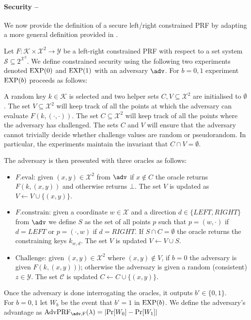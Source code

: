 \paragraph{Security -- } We now provide the definition of a secure left/right constrained PRF by adapting a more general definition provided in \cite{LRPRF}.

		\begin{secgame}
		Let $F: \mathcal{K} \times \mathcal{X}^2 \rightarrow \mathcal{Y}$ be a left-right constrained PRF with respect to a set system $\mathcal{S} \subseteq 2^{\mathcal{X}^2}$. We define constrained security using the following two experiments denoted $\mathrm{EXP}({0})$ and $\mathrm{EXP}({1})$ with an adversary $\adv$. For $b=0,1$ experiment $\mathrm{EXP}({b})$ proceeds as follows:

			A random key $k \in \mathcal{K}$ is selected and two helper sets $C,V \subseteq \mathcal{X}^2$ are initialised to $\emptyset$. The set $V \subseteq \mathcal{X}^2$ will keep track of all the points at which the adversary can evaluate $F(k, (\cdot,\cdot))$. The set $C \subseteq \mathcal{X}^2$ will keep track of all the points where the adversary has challenged. The sets $C$ and $V$ will ensure that the adversary cannot trivially decide whether challenge values are random or pseudorandom. In particular, the experiments maintain the invariant that $C \cap V = \emptyset$.

The adversary is then presented with three oracles as follows:

\begin{itemize}
	\item $F.\mathrm{eval}$: given $(x,y) \in \mathcal{X}^2$ from $\adv$ if $x \notin C$ the oracle returns $F(k, (x,y))$ and otherwise returns $\bot$. The set $V$ is updated as $V\leftarrow V \cup \{(x,y)\}$.
	\item $F.\mathrm{constrain}$: given a coordinate $w \in \mathcal{X}$ and a direction $d \in \{LEFT,RIGHT\}$ from $\adv$ we define $S$ as the set of all points $p$ such that $p = (w, \cdot)$ if $d=LEFT$ or $p = (\cdot, w)$ if $d=RIGHT$. If $S\cap C= \emptyset$ the oracle returns the constraining keys $k_{w, d}$. The set $V$ is updated $V\leftarrow V \cup S$.
	\item $\mathrm{Challenge}$: given $(x,y)\in \mathcal{X}^2$ where $(x,y) \notin V$, if $b=0$ the adversary is given $F(k, (x,y)))$; otherwise the adversary is given a random (consistent) $z \in \mathcal{Y}$. The set $\mathcal{C}$ is updated $C \leftarrow C \cup \{(x,y)\}$.
\end{itemize}
			Once the adversary is done interrogating the oracles, it outputs $b' \in \{0,1\}$.\\
			
			\noindent For $b = 0,1$ let $W_b$ be the event that $b'=1$ in $\mathrm{EXP}({b})$. We define the adversary's advantage as $\mathrm{AdvPRF_{\adv, F}}(\lambda) = |\mathrm{Pr}[W_0] - \mathrm{Pr}[W_1]|$
		\end{secgame}
		
